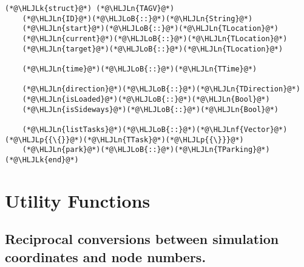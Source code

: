 \documentclass[12pt,a4paper]{article}
\newcommand{\HLJLk}[1]{\textcolor[RGB]{148,91,176}{\textbf{#1}}}
\newcommand{\HLJLn}[1]{#1}
\newcommand{\HLJLnf}[1]{\textcolor[RGB]{66,102,213}{#1}}
\newcommand{\HLJLoB}[1]{\textcolor[RGB]{102,102,102}{\textbf{#1}}}
\newcommand{\HLJLp}[1]{#1}
\begin{document}
\begin{lstlisting}
(*@\HLJLk{struct}@*) (*@\HLJLn{TAGV}@*)
    (*@\HLJLn{ID}@*)(*@\HLJLoB{::}@*)(*@\HLJLn{String}@*)
    (*@\HLJLn{start}@*)(*@\HLJLoB{::}@*)(*@\HLJLn{TLocation}@*)
    (*@\HLJLn{current}@*)(*@\HLJLoB{::}@*)(*@\HLJLn{TLocation}@*)
    (*@\HLJLn{target}@*)(*@\HLJLoB{::}@*)(*@\HLJLn{TLocation}@*)

    (*@\HLJLn{time}@*)(*@\HLJLoB{::}@*)(*@\HLJLn{TTime}@*)

    (*@\HLJLn{direction}@*)(*@\HLJLoB{::}@*)(*@\HLJLn{TDirection}@*)
    (*@\HLJLn{isLoaded}@*)(*@\HLJLoB{::}@*)(*@\HLJLn{Bool}@*)
    (*@\HLJLn{isSideways}@*)(*@\HLJLoB{::}@*)(*@\HLJLn{Bool}@*)

    (*@\HLJLn{listTasks}@*)(*@\HLJLoB{::}@*)(*@\HLJLnf{Vector}@*)(*@\HLJLp{{\{}}@*)(*@\HLJLn{TTask}@*)(*@\HLJLp{{\}}}@*)
    (*@\HLJLn{park}@*)(*@\HLJLoB{::}@*)(*@\HLJLn{TParking}@*)
(*@\HLJLk{end}@*)
\end{lstlisting}


\section{Utility Functions}
\subsection{Reciprocal conversions between simulation coordinates and node numbers.}
\end{document}
